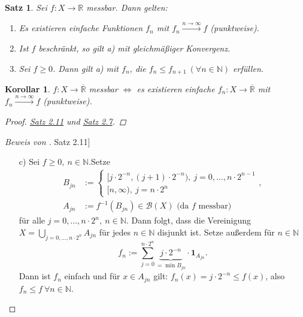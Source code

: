 \documentclass[a4paper]{scrreprt}
\newcommand{\doubleOne}{\textbf{1}}
\newcommand{\R}{\mathbb{R}}
\newcommand{\Rq}{\overline{\R}}
\newcommand{\N}{\mathbb{N}}
\newcommand{\Borel}{\mathcal{B}}
\newcommand{\jlabel}[1]{\label{j_#1}}
\newcommand{\jhyperref}[2]{\hyperref[j_#1]{#2}}
\newcommand{\jlink}[1]{\jhyperref{#1}{#1}}
\newcommand{\jabb}[3]{ #1: #2 \rightarrow #3 }
\theoremstyle{plain}
\newtheorem{satz}[thm]{Satz}
\newtheorem{kor}[thm]{Korollar}
\theoremstyle{definition}
\begin{document}
{{{\begin{satz}
\jlabel{Satz 2.11}
    Sei $\jabb{f}{X}{\R}$ messbar. Dann gelten:
    \begin{enumerate}
        \item Es existieren einfache Funktionen $f_n$ mit $f_n \xrightarrow{n\rightarrow\infty} f$ (punktweise).
        \item Ist $f$ beschränkt, so gilt a) mit gleichmäßiger Konvergenz.
        \item Sei $f\ge 0$. Dann gilt a) mit $f_n$, die $f_n \le f_{n+1} \ (\forall n\in\N)$ erfüllen.
    \end{enumerate}

\end{satz}

\begin{kor}
\jlabel{Kor 2.12}
    $\jabb{f}{X}{\Rq}$ messbar $\Leftrightarrow$ es existieren einfache $\jabb{f_n}{X}{\Rq}$ mit $f_n \xrightarrow{n\rightarrow \infty} f$ (punktweise).
    \begin{proof}
        \jlink{Satz 2.11} und \jlink{Satz 2.7}.
    \end{proof}
\end{kor}

\begin{proof}[Beweis von \jlink{Satz 2.11}]
    \begin{itemize}
        \item[c)] Sei $f\ge 0, \ n\in\N$.Setze
        \begin{displaymath}
            \begin{split}
                B_{jn} &:= \begin{cases} [j\cdot 2^{-n}, (j+1)\cdot 2^{-n}), \ j=0,\dots, n\cdot 2^{n-1} \\ [n, \infty), \ j = n\cdot 2^n \end{cases},\\
                A_{jn} &:= f^{-1}(B_{jn}) \in \Borel(X) \text{ (da $f$ messbar)}
            \end{split}
        \end{displaymath}
        für alle $j=0,\dots,n\cdot 2^n,\ n\in\N$. Dann folgt, dass die Vereinigung $X = \bigcup_{j=0,\dots,n\cdot 2^n} A_{jn}$ für jedes $n\in\N$ disjunkt ist. Setze außerdem für $n\in\N$
        \begin{displaymath}
            f_n := \sum_{j=0}^{n\cdot 2^n} \underbrace{j\cdot 2^{-n}}_{= \min B_{jn}} \cdot \doubleOne_{A_{jn}}.
        \end{displaymath}
        Dann ist $f_n$ einfach und für $x\in A_{jn}$ gilt: $f_n(x) = j\cdot 2^{-n} \le f(x)$, also $f_n \le f \ \forall n\in\N$.
        

\end{itemize}
\end{proof}}}}
\end{document}
